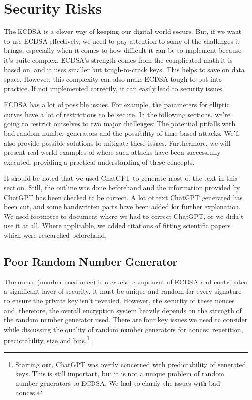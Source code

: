 \section{Security Risks}
The ECDSA is a clever way of keeping our digital world secure. But, if we want to use ECDSA effectively, we need to pay attention to some of the challenges it brings, especially when it comes to how difficult it can be to implement because it's quite complex. ECDSA's strength comes from the complicated math it is based on, and it uses smaller but tough-to-crack keys. This helps to save on data space. However, this complexity can also make ECDSA tough to put into practice. If not implemented correctly, it can easily lead to security issues.

ECDSA has a lot of possible issues. For example, the parameters for elliptic curves have a lot of restrictions to be secure. In the following sections, we're going to restrict ourselves to two major challenges: The potential pitfalls with bad random number generators and the possibility of time-based attacks. We'll also provide possible solutions to mitigate these issues. Furthermore, we will present real-world examples of where such attacks have been successfully executed, providing a practical understanding of these concepts.

It should be noted that we used ChatGPT to generate most of the text in this section. Still, the outline was done beforehand and the information provided by ChatGPT has been checked to be correct. A lot of text ChatGPT generated has been cut, and some handwritten parts have been added for further explanation. We used footnotes to document where we had to correct ChatGPT, or we didn't use it at all. Where applicable, we added citations of fitting scientific papers which were researched beforehand.

\subsection{Poor Random Number Generator}
The nonce (number used once) is a crucial component of ECDSA and contributes a significant layer of security. It must be unique and random for every signature to ensure the private key isn't revealed. However, the security of these nonces and, therefore, the overall encryption system heavily depends on the strength of the random number generator used. There are four key issues we need to consider while discussing the quality of random number generators for nonces: repetition, predictability, size and bias.\footnote{Starting out, ChatGPT was overly concerned with predictability of generated keys. This is still important, but it is not a unique problem of random number generators to ECDSA. We had to clarify the issues with bad nonces.}

